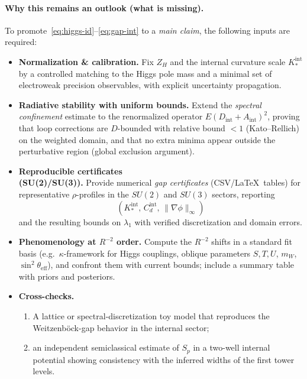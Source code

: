 \documentclass[11pt]{article}
\theoremstyle{definition}
\begin{document}
    \paragraph{Why this remains an outlook (what is missing).}
    To promote~\eqref{eq:higgs-id}--\eqref{eq:gap-int} to a \emph{main claim}, the following inputs are required:
    \begin{itemize}
    	\item \textbf{Normalization \& calibration.} 
    	Fix $Z_H$ and the internal curvature scale $K_\ast^{\mathrm{int}}$ by a controlled matching to the Higgs pole mass and a minimal set of electroweak precision observables, with explicit uncertainty propagation.
    	\item \textbf{Radiative stability with uniform bounds.}
    	Extend the \emph{spectral confinement} estimate to the renormalized operator $E(D_{\mathrm{int}}+A_{\mathrm{int}})^2$, proving that loop corrections are $D$-bounded with relative bound $<1$ (Kato--Rellich) on the weighted domain, and that no extra minima appear outside the perturbative region (global exclusion argument).
    	\item \textbf{Reproducible certificates\\ (SU(2)/SU(3)).}
    	Provide numerical \emph{gap certificates} (CSV/\LaTeX\ tables) for representative $\rho$-profiles in the $SU(2)$ and $SU(3)$ sectors, reporting $$(K_\ast^{\mathrm{int}},\,C_d^{\mathrm{int}},\,\|\nabla\phi\|_\infty)$$ and the resulting bounds on $\lambda_1$ with verified discretization and domain errors.
    	\item \textbf{Phenomenology at $R^{-2}$ order.}
    	Compute the $R^{-2}$ shifts in a standard fit basis (e.g.\ $\kappa$-framework for Higgs couplings, oblique parameters $S,T,U$, $m_W$, $\sin^2\theta_{\mathrm{eff}}$), and confront them with current bounds; include a summary table with priors and posteriors.
    	\item \textbf{Cross-checks.}
    	\begin{enumerate}[label=(\roman*)]
    	\item A lattice or spectral-discretization toy model that reproduces the Weitzenb\"ock-gap behavior in the internal sector; 
    	\item an independent semiclassical estimate of $S_p$ in a two-well internal potential showing consistency with the inferred widths of the first tower levels.
    	\end{enumerate}
    \end{itemize}
    
\end{document}
